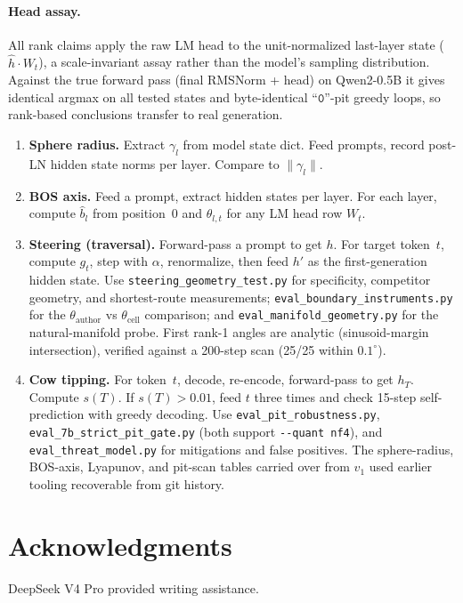 \documentclass{article}
\begin{document}
\paragraph{Head assay.} All rank claims apply the raw LM head to the
unit-normalized last-layer state ($\hat{h} \cdot W_t$), a scale-invariant
assay rather than the model's sampling distribution. Against the true forward
pass (final RMSNorm + head) on Qwen2-0.5B it gives identical argmax on all
tested states and byte-identical ``$\mathtt{0}$''-pit greedy loops, so
rank-based conclusions transfer to real generation.

\begin{enumerate}
\item \textbf{Sphere radius.} Extract $\gamma_l$ from model state dict. Feed
prompts, record post-LN hidden state norms per layer. Compare to $\|\gamma_l\|$.

\item \textbf{BOS axis.} Feed a prompt, extract hidden states per layer. For
each layer, compute $\hat{b}_l$ from position~0 and $\theta_{l,t}$ for any LM
head row $W_t$.

\item \textbf{Steering (traversal).} Forward-pass a prompt to get $h$. For
target token~$t$, compute $g_t$, step with $\alpha$, renormalize, then feed
$h'$ as the first-generation hidden state. Use
\texttt{steering\_geometry\_test.py} for specificity, competitor geometry,
and shortest-route measurements;
\texttt{eval\_boundary\_instruments.py} for the $\theta_{\mathrm{author}}$ vs
$\theta_{\mathrm{cell}}$ comparison; and \texttt{eval\_manifold\_geometry.py}
for the natural-manifold probe. First rank-1 angles are analytic
(sinusoid-margin intersection), verified against a 200-step scan (25/25
within $0.1^\circ$).

\item \textbf{Cow tipping.} For token~$t$, decode, re-encode, forward-pass to
get $h_T$. Compute $s(T)$. If $s(T) > 0.01$, feed $t$ three times and check
15-step self-prediction with greedy decoding. Use
\texttt{eval\_pit\_robustness.py}, \texttt{eval\_7b\_strict\_pit\_gate.py}
(both support \texttt{-{}-quant nf4}), and \texttt{eval\_threat\_model.py} for
mitigations and false positives. The sphere-radius, BOS-axis, Lyapunov, and
pit-scan tables carried over from $v_1$ used earlier tooling recoverable from
git history.
\end{enumerate}

\section*{Acknowledgments}
DeepSeek V4 Pro provided writing assistance.
\end{document}
